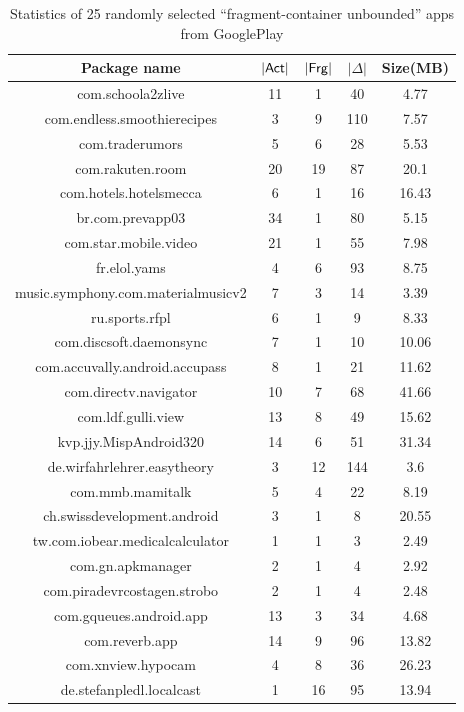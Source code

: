 
\begin{table}[htbp] 
	\begin{center}   
		\begin{tabular}{|c|c|c|c|c|}   
			\hline    \textbf{Package name} &\textbf{$|{\sf Act}|$} & \textbf{$|{\sf Frg}|$} & \textbf{$|\Delta|$} & \textbf{Size(MB)} \\  
			\hline   com.schoola2zlive & 11& 1& 40& 4.77  \\ 
			\hline    com.endless.smoothierecipes & 3& 9& 110& 7.57  \\ 
			\hline    com.traderumors & 5& 6& 28& 5.53  \\ 
			\hline   com.rakuten.room & 20& 19& 87& 20.1  \\ 
			\hline    com.hotels.hotelsmecca & 6& 1& 16& 16.43  \\ 
			\hline    br.com.prevapp03 & 34& 1& 80& 5.15  \\ 
			\hline     com.star.mobile.video & 21& 1& 55& 7.98  \\ 
			\hline     fr.elol.yams & 4& 6& 93& 8.75  \\ 
			\hline     music.symphony.com.materialmusicv2 & 7& 3& 14& 3.39  \\ 
			\hline     ru.sports.rfpl & 6& 1& 9& 8.33  \\ 
			\hline     com.discsoft.daemonsync & 7& 1& 10& 10.06  \\ 
			\hline     com.accuvally.android.accupass & 8& 1& 21& 11.62  \\ 
			\hline     com.directv.navigator & 10& 7& 68& 41.66  \\ 
			\hline    com.ldf.gulli.view & 13& 8& 49& 15.62  \\ 
			\hline     kvp.jjy.MispAndroid320 & 14& 6& 51& 31.34  \\ 
			\hline     de.wirfahrlehrer.easytheory & 3& 12& 144& 3.6  \\ 
			\hline     com.mmb.mamitalk & 5& 4& 22& 8.19  \\ 
			\hline   ch.swissdevelopment.android & 3& 1& 8& 20.55  \\ 
			\hline     tw.com.iobear.medicalcalculator & 1& 1& 3& 2.49  \\ 
			\hline     com.gn.apkmanager & 2& 1& 4& 2.92  \\ 
			\hline     com.piradevrcostagen.strobo & 2& 1& 4& 2.48  \\ 
			\hline     com.gqueues.android.app & 13& 3& 34& 4.68  \\ 
			\hline     com.reverb.app & 14& 9& 96& 13.82  \\ 
			\hline     com.xnview.hypocam & 4& 8& 36& 26.23  \\ 
			\hline     de.stefanpledl.localcast & 1& 16& 95& 13.94  \\ 
			\hline   
		\end{tabular}   
		\caption{Statistics of 25 randomly selected ``fragment-container unbounded'' apps from GooglePlay \label{tab:fc-unb-rand-gg} }
	\end{center}   
\end{table}